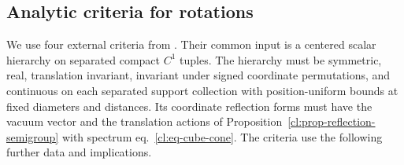 \documentclass[11pt,letterpaper,reqno]{amsart}
\numberwithin{equation}{section}
\renewcommand{\eqref}[1]{\textup{eq.~\ref{#1}}}
\theoremstyle{definition}
\theoremstyle{remark}
\begin{document}
\subsection{Analytic criteria for rotations}
\label{cl:subsec-rotation-criteria}

We use four external criteria from \cite[analytic insertion
densities, planar angular kernels, two-point angular elimination,
and all-orders angular closure]{Ext}. Their common input is a
centered scalar hierarchy on separated compact \(C^1\) tuples.
The hierarchy must be symmetric, real, translation invariant,
invariant under signed coordinate permutations, and continuous
on each separated support collection with position-uniform
bounds at fixed diameters and distances. Its coordinate
reflection forms must have the vacuum vector and the translation
actions of Proposition~\ref{cl:prop-reflection-semigroup}
with spectrum \eqref{cl:eq-cube-cone}. The criteria use the
following further data and implications.
\end{document}
